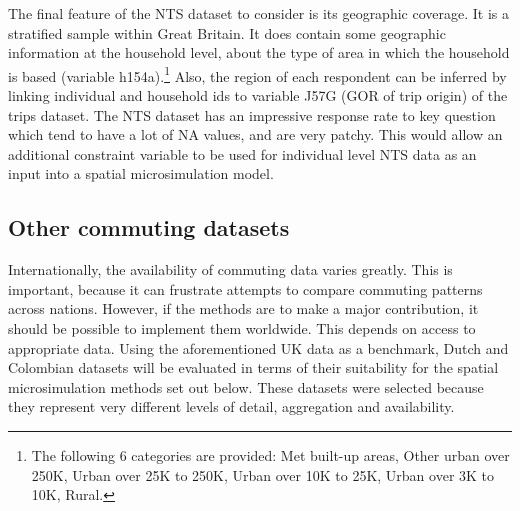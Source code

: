 \documentclass[a4paper, 11pt, twoside]{Thesis}
\begin{document}
The final feature of the NTS dataset to consider is its geographic coverage. It
is a stratified sample within Great Britain. It does contain some geographic
information at the household level, about the type of area in which the
household is based (variable h154a).\footnote{The following 6 categories are
provided:
 Met built-up areas,
 Other urban over 250K,
 Urban over 25K to 250K,
 Urban over 10K to 25K,
 Urban over 3K to 10K,
 Rural.}
Also, the region of each respondent can be inferred by linking individual and
household ids to variable J57G (GOR of trip origin) of the trips dataset.
The NTS dataset has an impressive response rate to key question which tend to
have a lot of NA values, and are very patchy. This would allow an
additional constraint variable to be used for individual level NTS data as an
input into a spatial microsimulation model.

\subsection{Other commuting datasets}
Internationally, the availability of commuting data varies greatly.
This is important, because it can frustrate attempts to compare commuting
patterns across nations. However, if the methods
are to make a major contribution, it should be possible to implement them
worldwide. This depends on access to appropriate data.
Using the aforementioned UK data as a benchmark, Dutch and Colombian datasets
will be evaluated in terms of their suitability for the spatial microsimulation
methods set out below. These datasets were selected because they represent
very different levels of detail, aggregation and availability.
\end{document}
